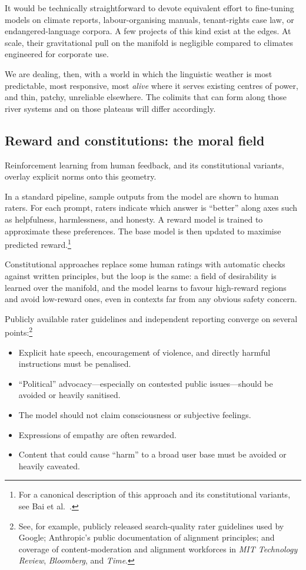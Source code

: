 It would be technically straightforward to devote equivalent effort to fine-tuning models on climate reports, labour-organising manuals, tenant-rights case law, or endangered-language corpora. A few projects of this kind exist at the edges. At scale, their gravitational pull on the manifold is negligible compared to climates engineered for corporate use.

We are dealing, then, with a world in which the linguistic weather is most predictable, most responsive, most \emph{alive} where it serves existing centres of power, and thin, patchy, unreliable elsewhere. The colimits that can form along those river systems and on those plateaus will differ accordingly.

\subsection{Reward and constitutions: the moral field}

Reinforcement learning from human feedback, and its constitutional variants, overlay explicit norms onto this geometry.

In a standard pipeline, sample outputs from the model are shown to human raters. For each prompt, raters indicate which answer is ``better'' along axes such as helpfulness, harmlessness, and honesty. A reward model is trained to approximate these preferences. The base model is then updated to maximise predicted reward.\footnote{For a canonical description of this approach and its constitutional variants, see Bai et al.\ \cite{bai2022constitutional}.}

Constitutional approaches replace some human ratings with automatic checks against written principles, but the loop is the same: a field of desirability is learned over the manifold, and the model learns to favour high-reward regions and avoid low-reward ones, even in contexts far from any obvious safety concern.

Publicly available rater guidelines and independent reporting converge on several points:\footnote{See, for example, publicly released search-quality rater guidelines used by Google; Anthropic's public documentation of alignment principles; and coverage of content-moderation and alignment workforces in \emph{MIT Technology Review}, \emph{Bloomberg}, and \emph{Time}.}

\begin{itemize}
  \item Explicit hate speech, encouragement of violence, and directly harmful instructions must be penalised.
  \item ``Political'' advocacy---especially on contested public issues---should be avoided or heavily sanitised.
  \item The model should not claim consciousness or subjective feelings.
  \item Expressions of empathy are often rewarded.
  \item Content that could cause ``harm'' to a broad user base must be avoided or heavily caveated.
\end{itemize}

